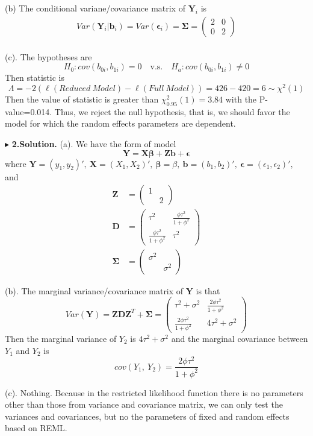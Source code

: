 \documentclass[letterpaper, 12pt]{article}
\newcommand{\ba}{$$\begin{aligned}}
\newcommand{\ea}{\end{aligned}$$}
\begin{document}
(b) The conditional variane/covariance matrix of $\bm{Y}_i$ is 
\ba
Var(\bm{Y}_i|\bm{b}_i)=Var(\bm{\epsilon}_i)=\bm{\Sigma}=\left(\begin{matrix}
2&0\\
0&2
\end{matrix}\right)\\
\ea

(c). The hypotheses are
$$
H_0:cov(b_{0i},b_{1i})=0\quad\text{v.s.}\quad H_a:cov(b_{0i},b_{1i})\not=0
$$
Then statistic is 
$$
\Lambda=-2(\ell(Reduced~Model)-\ell(Full~Model))=426-420=6\sim\chi^2(1)
$$
Then the value of statistic is greater than $\chi^2_{0.95}(1)=3.84$ with the P-value=0.014. Thus, we reject the null hypothesis, that is, we should favor the model for which the random effects parameters are dependent.



$\blacktriangleright$ \textbf{2.\quad Solution.} 
(a). We have the form of model 
$$
\bm{Y}=\bm{X}\bm{\beta}+\bm{Z}\bm{b}+\bm{\epsilon}
$$
where $
\bm{Y}=(y_1,y_2)',~
\bm{X}=(X_1,X_2)',~
\bm{\beta}=\beta,~
\bm{b}=(b_1,b_2)',~
\bm{\epsilon}=(\epsilon_1,\epsilon_2)',
$ and
\ba
\bm{Z}&=\left(\begin{matrix}
1\\
&2\end{matrix}\right)\\
\bm{D}&=\left(\begin{matrix}
\tau^2&\frac{\phi\tau^2}{1+\phi^2}\\
\frac{\phi\tau^2}{1+\phi^2}&\tau^2\end{matrix}\right)\\
\bm{\Sigma}&=\left(\begin{matrix}
\sigma^2\\
&\sigma^2\end{matrix}\right)
\ea


(b). The marginal variance/covariance matrix of $\bm{Y}$ is that
$$
Var(\bm{Y})=\bm{ZDZ}^T+\bm{\Sigma}=\left(\begin{matrix}
\tau^2+\sigma^2&\frac{2\phi\tau^2}{1+\phi^2}\\
\frac{2\phi\tau^2}{1+\phi^2}&4\tau^2+\sigma^2\end{matrix}\right)
$$
Then the marginal variance of $Y_2$ is $4\tau^2+\sigma^2$ and the marginal covariance between $Y_1$ and $Y_2$ is 
$$
cov(Y_1,~Y_2)=\frac{2\phi\tau^2}{1+\phi^2}
$$



(c). Nothing. Because in the restricted likelihood function there is no parameters other than those from variance and covariance matrix, we can only test the variances and covariances, but no the parameters of fixed and random effects based on REML. 
\end{document}
